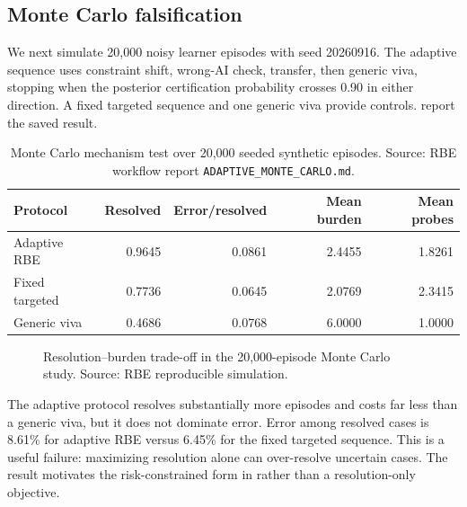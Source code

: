 \documentclass[11pt]{article}
\begin{document}
\subsection{Monte Carlo falsification}
We next simulate 20,000 noisy learner episodes with seed 20260916. The adaptive sequence uses constraint shift, wrong-AI check, transfer, then generic viva, stopping when the posterior certification probability crosses 0.90 in either direction. A fixed targeted sequence and one generic viva provide controls.  report the saved result.

\begin{table}[t]
\centering
\caption{Monte Carlo mechanism test over 20,000 seeded synthetic episodes. Source: RBE workflow report \texttt{ADAPTIVE\_MONTE\_CARLO.md}.}
\label{tab:mc}
\begin{tabular}{lrrrr}
\toprule
Protocol & Resolved & Error/resolved & Mean burden & Mean probes \\
\midrule
Adaptive RBE & 0.9645 & 0.0861 & 2.4455 & 1.8261 \\
Fixed targeted & 0.7736 & 0.0645 & 2.0769 & 2.3415 \\
Generic viva & 0.4686 & 0.0768 & 6.0000 & 1.0000 \\
\bottomrule
\end{tabular}
\end{table}

\begin{figure}[t]
\centering
{}
\caption{Resolution--burden trade-off in the 20,000-episode Monte Carlo study. Source: RBE reproducible simulation.}
\label{fig:mc}
\end{figure}

The adaptive protocol resolves substantially more episodes and costs far less than a generic viva, but it does not dominate error. Error among resolved cases is 8.61\% for adaptive RBE versus 6.45\% for the fixed targeted sequence. This is a useful failure: maximizing resolution alone can over-resolve uncertain cases. The result motivates the risk-constrained form in  rather than a resolution-only objective.
\end{document}
